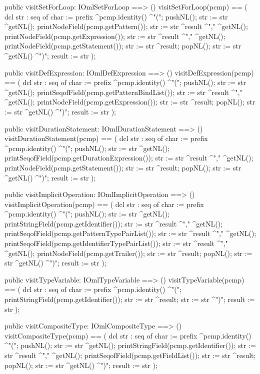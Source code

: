 \begin{vdm_al}
  public visitSetForLoop: IOmlSetForLoop ==> ()
  visitSetForLoop(pcmp) ==
    ( dcl str : seq of char := prefix ^pcmp.identity() ^"(";
      pushNL();
      str := str ^getNL();
      printNodeField(pcmp.getPattern());
      str := str ^result ^"," ^getNL();
      printNodeField(pcmp.getExpression());
      str := str ^result ^"," ^getNL();
      printNodeField(pcmp.getStatement());
      str := str ^result;
      popNL();
      str := str ^getNL() ^")";
      result := str );

  public visitDefExpression: IOmlDefExpression ==> ()
  visitDefExpression(pcmp) ==
    ( dcl str : seq of char := prefix ^pcmp.identity() ^"(";
      pushNL();
      str := str ^getNL();
      printSeqofField(pcmp.getPatternBindList());
      str := str ^result ^"," ^getNL();
      printNodeField(pcmp.getExpression());
      str := str ^result;
      popNL();
      str := str ^getNL() ^")";
      result := str );

  public visitDurationStatement: IOmlDurationStatement ==> ()
  visitDurationStatement(pcmp) ==
    ( dcl str : seq of char := prefix ^pcmp.identity() ^"(";
      pushNL();
      str := str ^getNL();
      printSeqofField(pcmp.getDurationExpression());
      str := str ^result ^"," ^getNL();
      printNodeField(pcmp.getStatement());
      str := str ^result;
      popNL();
      str := str ^getNL() ^")";
      result := str );

  public visitImplicitOperation: IOmlImplicitOperation ==> ()
  visitImplicitOperation(pcmp) ==
    ( dcl str : seq of char := prefix ^pcmp.identity() ^"(";
      pushNL();
      str := str ^getNL();
      printStringField(pcmp.getIdentifier());
      str := str ^result ^"," ^getNL();
      printSeqofField(pcmp.getPatternTypePairList());
      str := str ^result ^"," ^getNL();
      printSeqofField(pcmp.getIdentifierTypePairList());
      str := str ^result ^"," ^getNL();
      printNodeField(pcmp.getTrailer());
      str := str ^result;
      popNL();
      str := str ^getNL() ^")";
      result := str );

  public visitTypeVariable: IOmlTypeVariable ==> ()
  visitTypeVariable(pcmp) ==
    ( dcl str : seq of char := prefix ^pcmp.identity() ^"(";
      printStringField(pcmp.getIdentifier());
      str := str ^result;
      str := str ^")";
      result := str );

  public visitCompositeType: IOmlCompositeType ==> ()
  visitCompositeType(pcmp) ==
    ( dcl str : seq of char := prefix ^pcmp.identity() ^"(";
      pushNL();
      str := str ^getNL();
      printStringField(pcmp.getIdentifier());
      str := str ^result ^"," ^getNL();
      printSeqofField(pcmp.getFieldList());
      str := str ^result;
      popNL();
      str := str ^getNL() ^")";
      result := str );


\end{vdm_al}
